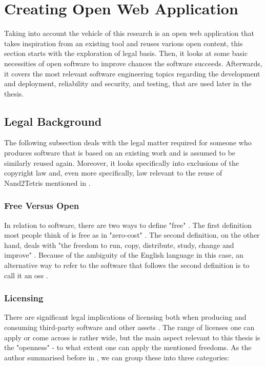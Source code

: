 \section{Creating Open Web Application}
\label{sec:creating-application}

Taking into account the vehicle of this research is an open web application that takes inspiration from an existing tool and reuses various open content, this section starts with the exploration of legal basis.
Then, it looks at some basic necessities of open software to improve chances the software succeeds.
Afterwards, it covers the most relevant software engineering topics regarding the development and deployment, reliability and security, and testing, that are used later in the thesis.

\subsection{Legal Background}

The following subsection deals with the legal matter required for someone who produces software that is based on an existing work and is assumed to be similarly reused again.
Moreover, it looks specifically into exclusions of the copyright law and, even more specifically, law relevant to the reuse of Nand2Tetris mentioned in .

\subsubsection{Free Versus Open}

In relation to software, there are two ways to define "free" \parencite[Chapter~1]{Fogel_2022}.
The first definition most people think of is free as in "zero-cost" \parencite[Chapter~1]{Fogel_2022}.
The second definition, on the other hand, deals with "the freedom to run, copy, distribute, study, change and improve" \parencite{FFS_2023}.
Because of the ambiguity of the English language in this case, an alternative way to refer to the software that follows the second definition is to call it an \gls{oss} \parencite{Fogel_2022}.

\subsubsection{Licensing}

There are significant legal implications of licensing both when producing and consuming third-party software and other assets \parencites[Chapter~9]{Fogel_2022}[pp. 11-12]{Duras_2020}.
The range of licenses one can apply or come across is rather wide, but the main aspect relevant to this thesis is the "openness" - to what extent one can apply the mentioned freedoms.
As the author summarised before in \textcite{Duras_2020}, we can group these into three categories:

